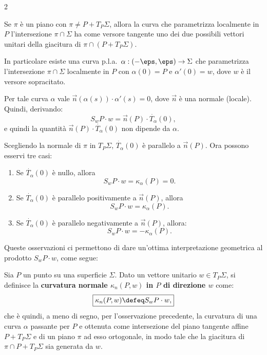 \begin{multicols*}{2}
    \begin{remark} \label{rmk:curvatura_normale}
        Se $\pi$ è un piano con $\pi \neq P + T_P \Sigma$, allora la curva che parametrizza
        localmente in $P$ l'intersezione $\pi \cap \Sigma$ ha come versore tangente uno
        dei due possibili vettori unitari della giacitura di $\pi \cap (P + T_P \Sigma)$. \smallskip

        In particolare esiste una curva p.l.a.~$\alpha : (-\eps, \eps) \to \Sigma$ che parametrizza
        l'intersezione $\pi \cap \Sigma$ localmente in $P$ con $\alpha(0) = P$ e
        $\alpha'(0) = w$, dove $w$ è il versore sopracitato. \smallskip

        Per tale curva $\alpha$ vale $\vec{n}(\alpha(s)) \cdot \alpha'(s) = 0$, dove
        $\vec{n}$ è una normale (locale). Quindi, derivando:
        \[
            \boxed{S_w P \cdot w = \vec{n}(P) \cdot \dot{T_\alpha}(0),}
        \]
        e quindi la quantità $\vec{n}(P) \cdot \dot{T_\alpha}(0)$ non dipende da $\alpha$. \smallskip

        Scegliendo la normale di $\pi$ in $T_P \Sigma$, $\dot{T_\alpha}(0)$ è parallelo a $\vec{n}(P)$.
        Ora possono esservi tre casi:
        \begin{enumerate}
            \item Se $\dot{T_\alpha}(0)$ è nullo, allora
                  \[ S_w P \cdot w = \kappa_\alpha(P) = 0. \]
            \item Se $\dot{T_\alpha}(0)$ è parallelo positivamente a $\vec{n}(P)$, allora
                  \[ S_w P \cdot w = \kappa_\alpha(P). \]
            \item Se $\dot{T_\alpha}(0)$ è parallelo negativamente a $\vec{n}(P)$, allora:
                  \[ S_w P \cdot w = -\kappa_\alpha(P). \]
        \end{enumerate}

        Queste osservazioni ci permettono di dare un'ottima interpretazione
        geometrica al prodotto $S_w P \cdot w$, come segue:
    \end{remark}

    \begin{definition}
        Sia $P$ un punto su una superficie $\Sigma$. Dato un vettore unitario
        $w \in T_P \Sigma$, si definisce la \textbf{curvatura normale $\kappa_n(P, w)$ in $P$
            di direzione $w$}
        come:
        \[
            \boxed{\kappa_n(P, w) \defeq S_w P \cdot w,}
        \]
        che è quindi, a meno di segno, per l'osservazione precedente, la curvatura di una curva
        $\alpha$ passante per $P$ e ottenuta come intersezione del piano
        tangente affine $P + T_P \Sigma$ e di un piano $\pi$ ad esso ortogonale,
        in modo tale che la giacitura di $\pi \cap P + T_P \Sigma$ sia
        generata da $w$. \smallskip


\end{definition}
\end{multicols*}
